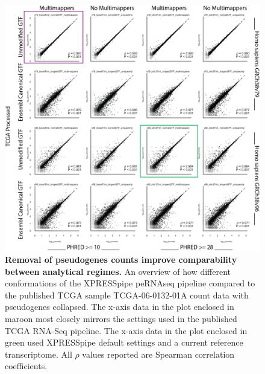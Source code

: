 \documentclass[10pt, oneside]{article}
\begin{document}
\begin{figure}
\centering
  \includegraphics[width=180mm]{figures/xpresspipe_supplement7.png}
  \caption{\textbf{Removal of pseudogenes counts improve comparability between analytical regimes.} An overview of how different conformations of the XPRESSpipe peRNAseq pipeline compared to the published TCGA sample TCGA-06-0132-01A count data with pseudogenes collapsed. The x-axis data in the plot enclosed in maroon most closely mirrors the settings used in the published TCGA RNA-Seq pipeline. The x-axis data in the plot enclosed in green used XPRESSpipe default settings and a current reference transcriptome. All $\rho$ values reported are Spearman correlation coefficients.}
  \label{fig:supplement7}
\end{figure}
\end{document}
